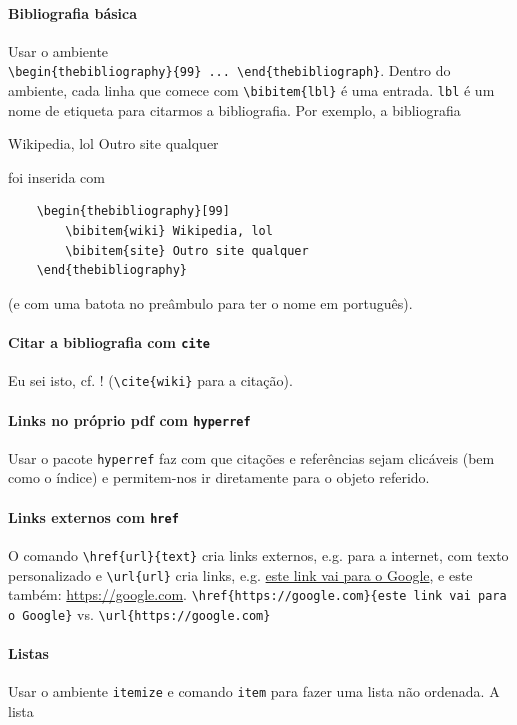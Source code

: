 \documentclass[11pt]{article}
\begin{document}
\paragraph{Bibliografia básica}
Usar o ambiente \\ \verb|\begin{thebibliography}{99} ... \end{thebibliograph}|.
Dentro do ambiente, cada linha que comece com \verb|\bibitem{lbl}| é uma entrada.
\texttt{lbl} é um nome de etiqueta para citarmos a bibliografia. Por exemplo,
a bibliografia
\begin{thebibliography}{99}
     Wikipedia, lol
     Outro site qualquer
\end{thebibliography}
foi inserida com
\begin{verbatim}
    \begin{thebibliography}[99]
        \bibitem{wiki} Wikipedia, lol
        \bibitem{site} Outro site qualquer
    \end{thebibliography}
\end{verbatim}
(e com uma batota no preâmbulo para ter o nome em português).

\paragraph{Citar a bibliografia com \texttt{cite}}
Eu sei isto, cf. \cite{wiki}! (\verb|\cite{wiki}| para a citação).

\paragraph{Links no próprio pdf com \texttt{hyperref}}
Usar o pacote \texttt{hyperref} faz com que citações e referências sejam
clicáveis (bem como o índice) e permitem-nos ir diretamente para o objeto
referido.

\paragraph{Links externos com \texttt{href}}
O comando \verb|\href{url}{text}| cria links externos, e.g. para a internet,
com texto personalizado e \verb|\url{url}| cria links, e.g.
\href{https://google.com}{este link vai para o Google}, e este também:
\url{https://google.com}.
\verb|\href{https://google.com}{este link vai para o Google}| vs.
\verb|\url{https://google.com}|

\paragraph{Listas}
Usar o ambiente \texttt{itemize} e comando \texttt{item} para fazer uma lista não ordenada.
A lista
\end{document}
